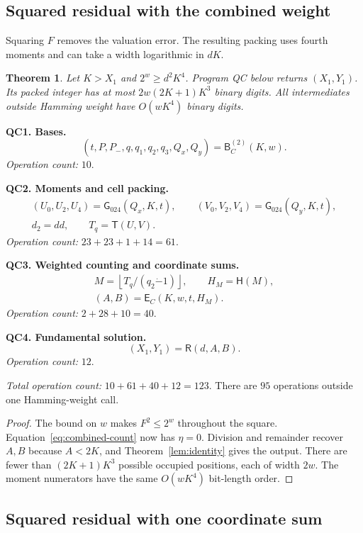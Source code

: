 \documentclass[11pt]{article}
\newtheorem{theorem}{Theorem}
\theoremstyle{remark}
\newcommand{\tsub}{\mathbin{\dot{-}}}
\newcommand{\fl}[1]{\left\lfloor #1\right\rfloor}
\newcommand{\Gtriple}{\mathsf{G}_{024}}
\newcommand{\Recover}{\mathsf{R}}
\newcommand{\Squared}{\mathsf{T}}
\begin{document}
\subsection{Squared residual with the combined weight}\label{sec:qc}

Squaring $F$ removes the valuation error. The resulting packing uses
fourth moments and can take a width logarithmic in $dK$.

\begin{theorem}\label{thm:qc}
Let $K>X_1$ and $2^w\ge d^2K^4$.
Program QC below returns $(X_1,Y_1)$.
Its packed integer has at most $2w(2K+1)K^3$ binary digits.
All intermediates outside Hamming weight have $O(wK^4)$ binary digits.
\end{theorem}

\textbf{QC1. Bases.}
\[
  (t,P,P_-,q,q_1,q_2,q_3,Q_x,Q_y)=\mathsf B_C^{(2)}(K,w).
\]
\emph{Operation count:} $10$.

\textbf{QC2. Moments and cell packing.}
\begin{gather*}
  (U_0,U_2,U_4)=\Gtriple(Q_x,K,t),\qquad
  (V_0,V_2,V_4)=\Gtriple(Q_y,K,t),\\
  d_2=dd,\qquad T_q=\Squared(U,V).
\end{gather*}
\emph{Operation count:} $23+23+1+14=61$.

\textbf{QC3. Weighted counting and coordinate sums.}
\begin{gather*}
  M=\fl{T_q/(q_2\tsub1)},\qquad H_M=\mathsf H(M),\\
  (A,B)=\mathsf E_C(K,w,t,H_M).
\end{gather*}
\emph{Operation count:} $2+28+10=40$.

\textbf{QC4. Fundamental solution.}
\[
  (X_1,Y_1)=\Recover(d,A,B).
\]
\emph{Operation count:} $12$.

\emph{Total operation count:} $10+61+40+12=123$.
There are $95$ operations outside one Hamming-weight call.

\begin{proof}
The bound on $w$ makes $F^2\le2^w$ throughout the square.
Equation~\eqref{eq:combined-count} now has $\eta=0$.
Division and remainder recover $A,B$ because $A<2K$, and
Theorem~\ref{lem:identity} gives the output.
There are fewer than $(2K+1)K^3$ possible occupied positions,
each of width $2w$. The moment numerators have the same
$O(wK^4)$ bit-length order.
\end{proof}

\subsection{Squared residual with one coordinate sum}\label{sec:qo}
\end{document}
